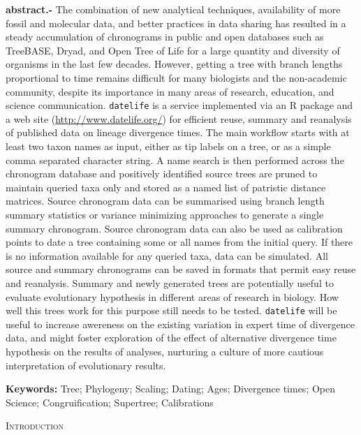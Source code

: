 \documentclass[11pt,]{article}
\begin{document}
\vskip -8.5pt



\noindent \doublespacing 

\newpage

\textbf{abstract.-} The combination of new analytical techniques,
availability of more fossil and molecular data, and better practices in
data sharing has resulted in a steady accumulation of chronograms in
public and open databases such as TreeBASE, Dryad, and Open Tree of Life
for a large quantity and diversity of organisms in the last few decades.
However, getting a tree with branch lengths proportional to time remains
difficult for many biologists and the non-academic community, despite
its importance in many areas of research, education, and science
communication. \texttt{datelife} is a service implemented via an R
package and a web site (\url{http://www.datelife.org/}) for efficient
reuse, summary and reanalysis of published data on lineage divergence
times. The main workflow starts with at least two taxon names as input,
either as tip labels on a tree, or as a simple comma separated character
string. A name search is then performed across the chronogram database
and positively identified source trees are pruned to maintain queried
taxa only and stored as a named list of patristic distance matrices.
Source chronogram data can be summarised using branch length summary
statistics or variance minimizing approaches to generate a single
summary chronogram. Source chronogram data can also be used as
calibration points to date a tree containing some or all names from the
initial query. If there is no information available for any queried
taxa, data can be simulated. All source and summary chronograms can be
saved in formats that permit easy reuse and reanalysis. Summary and
newly generated trees are potentially useful to evaluate evolutionary
hypothesis in different areas of research in biology. How well this
trees work for this purpose still needs to be tested. \texttt{datelife}
will be useful to increase awereness on the existing variation in expert
time of divergence data, and might foster exploration of the effect of
alternative divergence time hypothesis on the results of analyses,
nurturing a culture of more cautious interpretation of evolutionary
results.

\textbf{Keywords:} Tree; Phylogeny; Scaling; Dating; Ages; Divergence
times; Open Science; Congruification; Supertree; Calibrations \newpage

\begin{center}
\textsc{Introduction}
\end{center}
\end{document}
